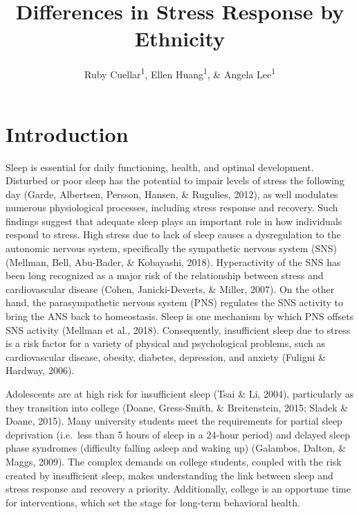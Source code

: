 \documentclass[man, fleqn, noextraspace]{apa6}
\title{Differences in Stress Response by Ethnicity}
\author{Ruby Cuellar\textsuperscript{1}, Ellen Huang\textsuperscript{1}, \& Angela Lee\textsuperscript{1}}
\date{}
\begin{document}
\maketitle

\hypertarget{introduction}{%
\section{Introduction}\label{introduction}}

Sleep is essential for daily functioning, health, and optimal development. Disturbed or poor sleep has the potential to impair levels of stress the following day (Garde, Albertsen, Persson, Hansen, \& Rugulies, 2012), as well modulates numerous physiological processes, including stress response and recovery. Such findings suggest that adequate sleep plays an important role in how individuals respond to stress. High stress due to lack of sleep causes a dysregulation to the autonomic nervous system, specifically the sympathetic nervous system (SNS) (Mellman, Bell, Abu-Bader, \& Kobayashi, 2018). Hyperactivity of the SNS has been long recognized as a major risk of the relationship between stress and cardiovascular disease (Cohen, Janicki-Deverts, \& Miller, 2007). On the other hand, the parasympathetic nervous system (PNS) regulates the SNS activity to bring the ANS back to homeostasis. Sleep is one mechanism by which PNS offsets SNS activity (Mellman et al., 2018). Consequently, insufficient sleep due to stress is a risk factor for a variety of physical and psychological problems, such as cardiovascular disease, obesity, diabetes, depression, and anxiety (Fuligni \& Hardway, 2006).

Adolescents are at high risk for insufficient sleep (Tsai \& Li, 2004), particularly as they transition into college (Doane, Gress-Smith, \& Breitenstein, 2015; Sladek \& Doane, 2015). Many university students meet the requirements for partial sleep deprivation (i.e.~less than 5 hours of sleep in a 24-hour period) and delayed sleep phase syndromes (difficulty falling asleep and waking up) (Galambos, Dalton, \& Maggs, 2009). The complex demands on college students, coupled with the risk created by insufficient sleep, makes understanding the link between sleep and stress response and recovery a priority. Additionally, college is an opportune time for interventions, which set the stage for long-term behavioral health.
\end{document}

